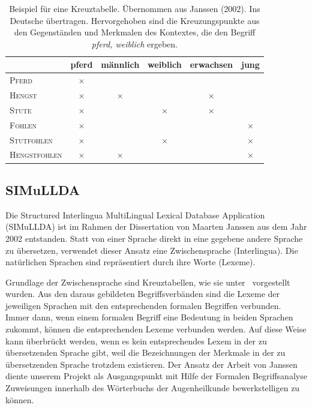 \documentclass[pagesize,DIV=calc,12pt,draft]{scrreprt}
\begin{document}
\begin{table}[h!]
\centering
\renewcommand{\arraystretch}{2}
\begin{tabular}{@{}lccccc@{}}
\toprule&
pferd &
männlich &
weiblich &
erwachsen &
jung\\
\midrule
\textsc{Pferd}	&	$\times$	&&&&\\

\textsc{Hengst}	&	$\times$	&	$\times$	&&	$\times$	&\\

\textsc{Stute}	&	$\times$	&&	$\times$	&	$\times$	&\\

\textsc{Fohlen}	&	$\times$	&&&&	$\times$\\

\textsc{Stutfohlen}	&	$\times$	&&	$\times$	&&	$\times$\\

\textsc{Hengstfohlen}	&	$\times$	&	$\times$	&&&	$\times$\\
\bottomrule
\end{tabular}
\caption{Beispiel für eine Kreuztabelle. Übernommen aus Janssen (2002). Ins Deutsche übertragen. Hervorgehoben sind die Kreuzungspunkte aus den Gegenständen und Merkmalen des Kontextes, die den Begriff \textit{pferd, weiblich} ergeben.}
\end{table}

\subsection{SIMuLLDA}

Die Structured Interlingua MultiLingual Lexical Database Application (SIMuLLDA) ist im Rahmen der Dissertation von Maarten Janssen aus dem Jahr 2002 entstanden. 
Statt von einer Sprache direkt in eine gegebene andere Sprache zu übersetzen, verwendet dieser Ansatz eine Zwischensprache (Interlingua). 
Die natürlichen Sprachen sind repräsentiert durch ihre Worte (Lexeme). 

Grundlage der Zwischensprache sind Kreuztabellen, wie sie unter\emph{~} vorgestellt wurden. 
Aus den daraus gebildeten Begriffsverbänden sind die Lexeme der jeweiligen Sprachen mit den entsprechenden formalen Begriffen verbunden. 
Immer dann, wenn einem formalen Begriff eine Bedeutung in beiden Sprachen zukommt, können die entsprechenden Lexeme verbunden werden. 
Auf diese Weise kann überbrückt werden, wenn es kein entsprechendes Lexem in der zu übersetzenden Sprache gibt, weil die Bezeichnungen der Merkmale in der zu übersetzenden Sprache trotzdem existieren. 
Der Ansatz der Arbeit von Janssen diente unserem Projekt als Ausgangspunkt mit Hilfe der Formalen Begriffsanalyse Zuweisungen innerhalb des Wörterbuchs der Augenheilkunde bewerkstelligen zu können. 
\end{document}
